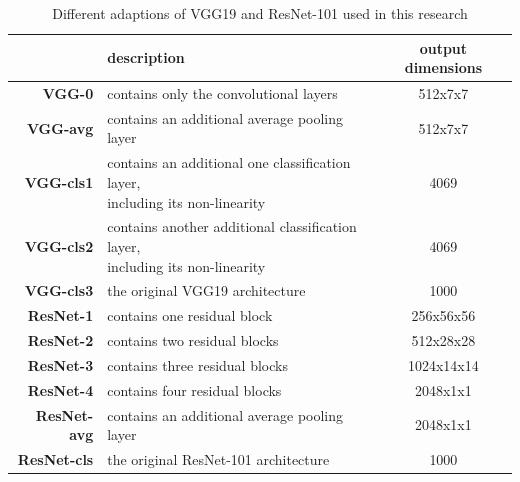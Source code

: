\begin{table}[h]
    \centering
    \begin{tabular}{rlc}
        \toprule
                            & \textbf{description}                                            & \textbf{ output dimensions } \\\midrule
        \textbf{VGG-0}      & contains only the convolutional layers                          & 512x7x7                      \\
        \textbf{VGG-avg}    & contains an additional average pooling layer                    & 512x7x7                      \\
        \textbf{VGG-cls1}   & \makecell[cl]{contains an additional one classification layer,                                 \\ including its non-linearity} & 4069                         \\
        \textbf{VGG-cls2}   & \makecell[cl]{contains another additional classification layer,                                \\ including its non-linearity} & 4069                         \\
        \textbf{VGG-cls3}   & the original VGG19 architecture                                 & 1000                         \\\midrule
        \textbf{ResNet-1}   & contains one residual block                                     & 256x56x56                    \\
        \textbf{ResNet-2}   & contains two residual blocks                                    & 512x28x28                    \\
        \textbf{ResNet-3}   & contains three residual blocks                                  & 1024x14x14                   \\
        \textbf{ResNet-4}   & contains four residual blocks                                   & 2048x1x1                     \\
        \textbf{ResNet-avg} & contains an additional average pooling layer                    & 2048x1x1                     \\
        \textbf{ResNet-cls} & the original ResNet-101 architecture                            & 1000                         \\
        \bottomrule
    \end{tabular}
    \caption{Different adaptions of VGG19 and ResNet-101 used in this research}
    \label{tab:feature-extractor-archs}
\end{table}


